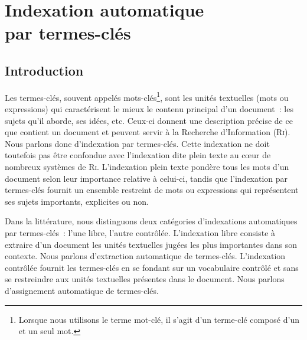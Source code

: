 \chapter[Indexation automatique par termes-clés]{Indexation automatique\\par termes-clés}
\label{part:main-state_of_the_art}
  \section{Introduction}
  \label{sec:main-state_of_the_art-introduction}
    Les termes-clés,
    souvent appelés mots-clés\footnote{Lorsque nous utilisons le terme
    \og{}mot-clé\fg{}, il s'agit d'un terme-clé composé d'un et un seul mot.},
    sont les unités textuelles (mots ou expressions) qui caractérisent le mieux
    le contenu principal d'un document~: les sujets qu'il aborde, ses idées,
    etc. Ceux-ci donnent une description précise de ce que contient un document
    et peuvent servir à la Recherche d'Information (\textsc{Ri}). Nous parlons
    donc d'indexation par termes-clés. Cette indexation ne doit toutefois pas être confondue
    avec l'indexation dite \og{}plein texte\fg{} au c\oe{}ur de nombreux
    systèmes de \textsc{Ri}. L'indexation plein texte pondère tous les mots d'un
    document selon leur importance relative à celui-ci, tandis que l'indexation
    par termes-clés fournit un ensemble restreint de mots ou expressions qui
    représentent ses sujets importants, explicites ou non.

    Dans la littérature, nous distinguons deux catégories d'indexations
    automatiques par termes-clés~: l'une libre, l'autre contrôlée. L'indexation
    libre consiste à extraire d'un document les unités textuelles
    jugées les plus importantes dans son contexte. Nous parlons d'extraction
    automatique de termes-clés. L'indexation contrôlée fournit les termes-clés en se fondant sur un vocabulaire
    contrôlé et sans se restreindre aux unités textuelles présentes dans le
    document. Nous parlons d'assignement automatique de
    termes-clés.

